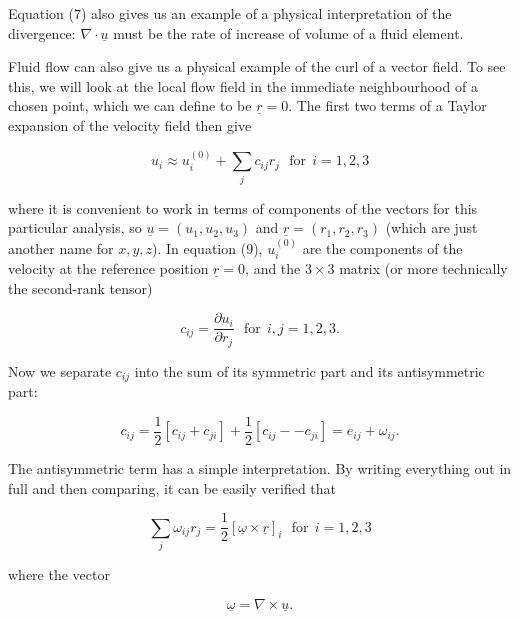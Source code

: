  Equation (7) also gives us an example of a physical interpretation of the 
  divergence: $\nabla \cdot \underline{u}$ must be the rate of increase of 
  volume of a fluid element. 

  Fluid flow can also give us a physical example of the curl of a vector field. 
  To see this, we will look at the local flow field in the immediate 
  neighbourhood of a chosen point, which we can define to be $\underline{r}=0$. 
  The first two terms of a Taylor expansion of the velocity field then give 

  \begin{equation*}u_i \approx u_i^{(0)} + \sum_j{c_{ij} r_j} 
  \mathrm{~~~for~~}i=1,2,3 \tag{9}\end{equation*} 

  \noindent{}where it is convenient to work in terms of components of the 
  vectors for this particular analysis, so $\underline{u} = (u_1,u_2,u_3)$ and 
  $\underline{r}=(r_1,r_2,r_3)$ (which are just another name for $x,y,z$). In 
  equation (9), $u_i^{(0)}$ are the components of the velocity at the reference 
  position $\underline{r}=0$, and the $3 \times 3$ matrix (or more technically 
  the second-rank tensor) 

  \begin{equation*}c_{ij} = \dfrac{\partial u_i}{\partial r_j} 
  \mathrm{~~~for~~}i,j=1,2,3 . \tag{10}\end{equation*} 

  Now we separate $c_{ij}$ into the sum of its symmetric part and its 
  antisymmetric part: 

  \begin{equation*}c_{ij} = \frac{1}{2}\left[c_{ij} + c_{ji} 
  \right]+\frac{1}{2}\left[c_{ij} -- c_{ji} \right] = e_{ij} + \omega_{ij} . 
  \tag{11}\end{equation*} 

  The antisymmetric term has a simple interpretation. By writing everything out 
  in full and then comparing, it can be easily verified that 

  \begin{equation*}\sum_j{\omega_{ij} r_j}=\frac{1}{2}[\underline{\omega} 
  \times \underline{r}]_i \mathrm{~~~for~~}i=1,2,3 \tag{12}\end{equation*} 

  \noindent{}where the vector 

  \begin{equation*}\underline{\omega} = \nabla \times \underline{u} 
  .\tag{13}\end{equation*} 

